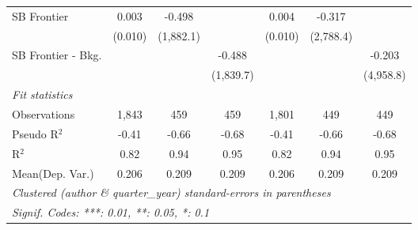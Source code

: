 \begin{tabular}{lcccccc}
   SB Frontier          & 0.003   & -0.498    &           & 0.004   & -0.317    &   \\   
                        & (0.010) & (1,882.1) &           & (0.010) & (2,788.4) &   \\   
   SB Frontier - Bkg.   &         &           & -0.488    &         &           & -0.203\\   
                        &         &           & (1,839.7) &         &           & (4,958.8)\\   
   \midrule
   \emph{Fit statistics}\\
   Observations         & 1,843   & 459       & 459       & 1,801   & 449       & 449\\  
   Pseudo R$^2$         & -0.41   & -0.66     & -0.68     & -0.41   & -0.66     & -0.68\\  
   R$^2$                & 0.82    & 0.94      & 0.95      & 0.82    & 0.94      & 0.95\\  
Mean(Dep. Var.) & 0.206 & 0.209 & 0.209 & 0.206 & 0.209 & 0.209 \\
   \midrule \midrule
   \multicolumn{7}{l}{\emph{Clustered (author \& quarter\_year) standard-errors in parentheses}}\\
   \multicolumn{7}{l}{\emph{Signif. Codes: ***: 0.01, **: 0.05, *: 0.1}}\\
\end{tabular}
\par\endgroup

